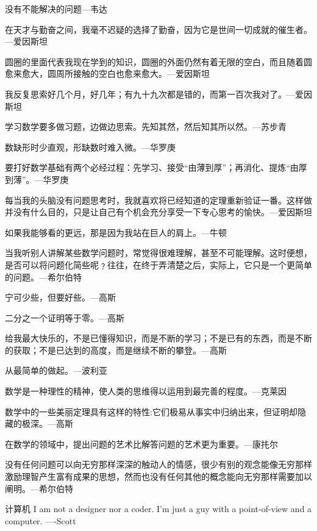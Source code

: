 \documentclass{article}
\begin{document}
没有不能解决的问题---韦达

在天才与勤奋之间，我毫不迟疑的选择了勤奋，因为它是世间一切成就的催生者。---爱因斯坦

圆圈的里面代表我现在学到的知识，圆圈的外面仍然有着无限的空白，而且随着圆愈来愈大，圆周所接触的空白也愈来愈大。---爱因斯坦

我反复思索好几个月，好几年；有九十九次都是错的，而第一百次我对了。---爱因斯坦

学习数学要多做习题，边做边思索。先知其然，然后知其所以然。---苏步青

数缺形时少直观，形缺数时难入微。---华罗庚

要打好数学基础有两个必经过程：先学习、接受“由薄到厚”；再消化、提炼“由厚到薄”。---华罗庚

每当我的头脑没有问题思考时，我就喜欢将已经知道的定理重新验证一番。这样做并没有什么目的，只是让自己有个机会充分享受一下专心思考的愉快。---爱因斯坦

如果我能够看的更远，那是因为我站在巨人的肩上。---牛顿

当我听别人讲解某些数学问题时，常觉得很难理解，甚至不可能理解。这时便想，是否可以将问题化简些呢﹖往往，在终于弄清楚之后，实际上，它只是一个更简单的问题。---希尔伯特

宁可少些，但要好些。---高斯

二分之一个证明等于零。---高斯

给我最大快乐的，不是已懂得知识，而是不断的学习；不是已有的东西，而是不断的获取；不是已达到的高度，而是继续不断的攀登。---高斯

从最简单的做起。---波利亚

数学是一种理性的精神，使人类的思维得以运用到最完善的程度。---克莱因

数学中的一些美丽定理具有这样的特性:它们极易从事实中归纳出来，但证明却隐藏的极深。---高斯

在数学的领域中，提出问题的艺术比解答问题的艺术更为重要。---康扥尔

没有任何问题可以向无穷那样深深的触动人的情感，很少有别的观念能像无穷那样激励理智产生富有成果的思想，然而也没有任何其他的概念能向无穷那样需要加以阐明。---希尔伯特

计算机
I am not a designer nor a coder. I'm just a guy with a point-of-view and a computer. ----Scott
\end{document}

